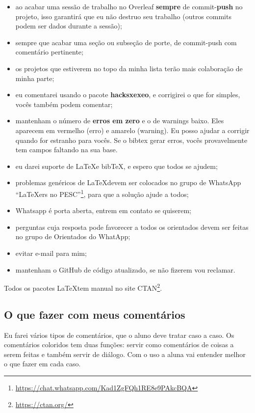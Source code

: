 \documentclass{article}
\begin{document}
\begin{itemize}
    \item ao acabar uma sessão de trabalho no Overleaf \textbf{sempre} de commit-\textbf{push} no projeto, isso garantirá que eu não destruo seu trabalho (outros commits podem ser dados durante a sessão);
    \item sempre que acabar uma seção ou subseção de porte, de commit-push com comentário pertinente;
    \item os projetos que estiverem no topo da minha lista terão mais colaboração de minha parte;
    \item eu comentarei usando o pacote \textbf{hacksxexeo}, e corrigirei o que for simples, vocês também podem comentar;
    \item mantenham o número de \textbf{erros em zero} e o de warnings baixo. Eles aparecem em vermelho (erro) e amarelo (warning). Eu posso ajudar a corrigir quando for estranho para vocês. Se o bibtex gerar erros, vocês provavelmente tem campos faltando na sua base.
    \item eu darei suporte de \LaTeX e bib\TeX, e espero que todos se ajudem;
    \item problemas genéricos de \LaTeX devem ser colocados no grupo de WhatsApp ``\LaTeX ers no PESC''\footnote{\url{https://chat.whatsapp.com/Kad1ZgFQh1RE8e9PAkcBQA}}, para que a solução ajude a todos;
    \item Whatsapp é porta aberta, entrem em contato se quiserem;
    \item perguntas cuja resposta pode favorecer a todos os orientados devem ser feitas no grupo de Orientados do WhatApp;
    \item evitar e-mail para mim;
    \item mantenham o GitHub de código atualizado, se não fizerem vou reclamar.
\end{itemize}

Todos os pacotes \LaTeX tem manual no site CTAN\footnote{\url{https://ctan.org/}}.

\subsection{O que fazer com meus comentários}

Eu farei vários tipos de comentários, que o aluno deve tratar caso a caso. Os comentários coloridos tem duas funções: servir como comentários de coisas a serem feitas e também servir de diálogo. Com o uso a aluna vai entender melhor o que fazer em cada caso.
\end{document}
